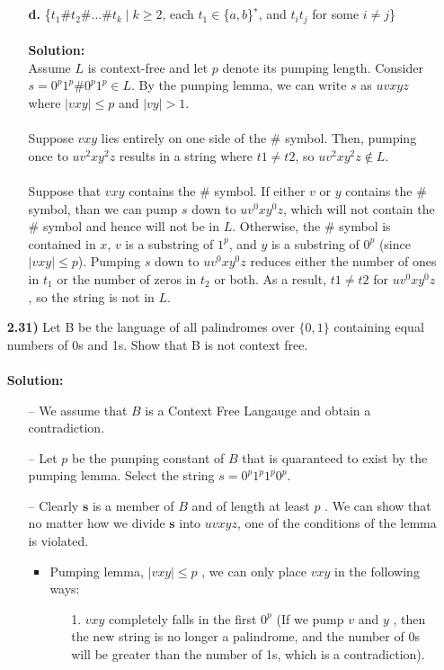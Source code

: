 \documentclass[12pt]{letter}
\begin{document}
\begin{enumerate}
\begin{enumerate}
	\leavevmode \\
	\leavevmode \\
	\item[\textbf{d.}] \{$t_1\#t_2\#...\#t_k \mid k \geq 2$, each $t_1 \in $\{$a,b$\}$^*$, and $t_it_j$ for some $i \neq j$\} \\
	\leavevmode \\
	\textbf{Solution:} \\
	Assume $L$ is context-free and let $p$ denote its pumping length. Consider $s = 0^p1^p\#0^p1^p \in L$. By the pumping lemma, we can write $s$ as $uvxyz$ where $|vxy| \leq p$ and $|vy| > 1$. \\
	\leavevmode \\
	Suppose $vxy$ lies entirely on one side of the \# symbol. Then, pumping once to $uv^2xy^2z$ results in a string where $t1 \neq t2$, so $uv^2xy^2z \notin L$. \\
	\leavevmode \\
	Suppose that $vxy$ contains the \# symbol. If either $v$ or $y$ contains the \# symbol, than we can pump $s$ down to $uv^0xy^0z$, which will not contain the \# symbol and hence will not be in $L$. Otherwise, the \# symbol is contained in $x$, $v$ is a substring of $1^p$, and $y$ is a substring of $0^p$ (since $|vxy| \leq p$). Pumping $s$ down to $uv^0xy^0z$ reduces either the number of ones in $t_1$ or the number of zeros in $t_2$ or both. As a result, $t1 \neq t2$ for $uv^0xy^0z$, so the string is not in $L$.
 \end{enumerate}

\newpage
\item[\textbf{2.31)}] Let B be the language of all palindromes over $\{0,1\}$ containing equal numbers of 0s and 1s. Show that B is not context free.\\
\leavevmode \\
\textbf{Solution:} \\
\begin{itemize}
	\item[--] We assume that $B$ is a Context Free Langauge and obtain a contradiction.
	\item[--] Let $p$ be the pumping constant of $B$ that is quaranteed to exist by the pumping lemma. Select the string $s=0^p1^p1^p0^p$.
	\item[--] Clearly $\textbf{s}$ is a member of $B$ and of length at least $p$ . We can show that no matter how we divide $\textbf{s}$ into $uvxyz$, one of the conditions of the lemma is violated.
	\begin{itemize}
		\item Pumping lemma, $|vxy| \leq p$ , we can only place $vxy$ in the following ways:
		\begin{enumerate}
			\item[1.] $vxy$ completely falls in the first $0^p$ (If we pump $v$ and $y$ , then the new string is no longer a palindrome, and the number of 0s will be greater than the number of 1s, which is a contradiction). \\
			

\end{enumerate}
\end{itemize}
\end{itemize}
\end{enumerate}
\end{document}
